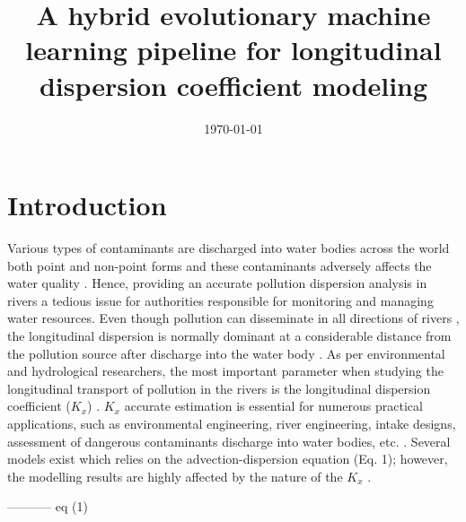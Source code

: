 \documentclass[a4paper,12pt, english]{article}
\title{A hybrid evolutionary machine learning pipeline for longitudinal dispersion coefficient modeling}
\author{}
\date{\today}
\begin{document}
\maketitle
\begin{abstract}
 
 
\end{abstract}

\section{\label{sec:intro} Introduction}

Various types of contaminants are discharged into water bodies across the world both point and non-point forms and these contaminants adversely affects the water quality \cite{noori2007assessment}. Hence, providing an accurate pollution dispersion analysis in rivers a tedious issue for authorities responsible for monitoring and managing water resources. Even though pollution can disseminate in all directions of rivers \cite{tayfur2005predicting}, the longitudinal dispersion is normally dominant at a considerable distance from the pollution source after discharge into the water body \cite{riahi2009expert}. As per environmental and hydrological researchers, the most important parameter when studying the longitudinal transport of pollution in the rivers is the longitudinal dispersion coefficient ($K_x$) \cite{kashefipour2002longitudinal, etemad2012predicting, hamidifar2015longitudinal, dehghani2020novel, wang2017physically, farzadkhoo2018comparative, baek2019deriving, farzadkhoo2019flow}. $K_x$ accurate estimation is essential for numerous practical applications, such as environmental engineering, river engineering, intake designs, assessment of dangerous contaminants discharge into water bodies, etc. \cite{alizadeh2017improvement}. Several models exist which relies on the advection-dispersion equation (Eq. 1); however, the modelling results are highly affected by the nature of the $K_x$ \cite{noori2016reliable}.

----------- eq (1)
\end{document}

